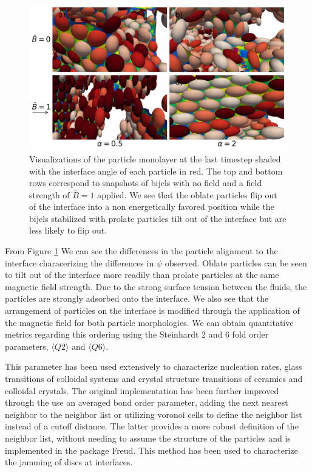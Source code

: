 \begin{figure}
        \centering
        \includegraphics[scale = 0.4]{figures/results/paper1/psi_concat.png}
        \caption{Visualizations of the particle monolayer at the last timestep shaded with the interface angle of each particle in red. The top and bottom
                 rows correspond to snapshots of bijels with no field and a field strength of $\bar{B} = 1$ applied. We see that the oblate particles flip
                 out of the interface into a non energetically favored position while the bijels stabilized with prolate particles tilt out of the interface
                 but are less likely to flip out.}
        \label{fig:psi_viz_ss}
\end{figure}

From Figure \ref{fig:psi_viz_ss} We can see the differences in the particle alignment to the interface characerizing the differences in $\psi$ observed. Oblate
particles can be seen to tilt out of the interface more readily than prolate particles at the same magnetic field strength. Due to the strong surface tension
between the fluids, the particles are strongly adsorbed onto the interface. We also see that the arrangement of particles on the interface is modified through the
application of the magnetic field for both particle morphologies. We can obtain quantitative metrics regarding this ordering using the Steinhardt 2 and 6 fold
order parameters, $\langle Q2 \rangle$ and $\langle Q6 \rangle$. 

This parameter has been used extensively to characterize nucleation rates, glass transitions of colloidal systems and crystal structure transitions of ceramics 
and colloidal crystals. \cite{vagberg_glassiness_2011, besseling_three-dimensional_2007, schall_structural_2007} The original implementation has been further 
improved through the use an averaged bond order parameter, adding the next nearest neighbor to the neighbor list or utilizing voronoi cells to define the 
neighbor list instead of a cutoff distance. The latter provides a more robust definition of the neighbor list, without needing to assume the structure of 
the particles and is implemented in the package Freud. \cite{ramasubramani_freud_2020} This method has been used to characterize the jamming of discs at 
interfaces. \cite{ozawa_jamming_2012}

